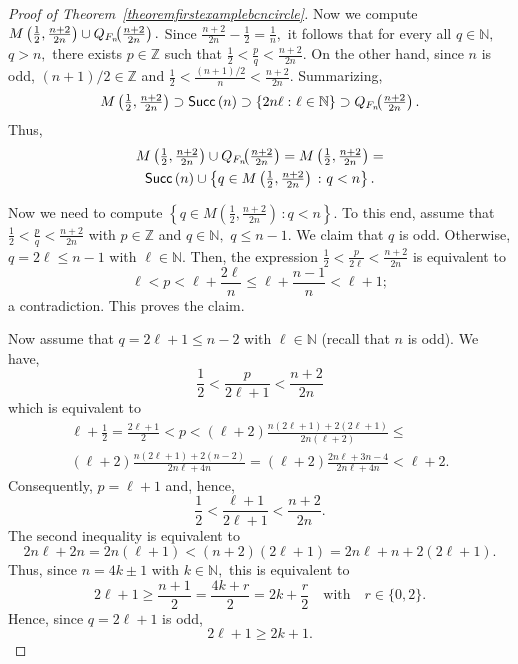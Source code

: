 \documentclass[a4paper, 11pt]{amsart}
\numberwithin{equation}{section}
\theoremstyle{customnumberedtheorem}
\theoremstyle{definitionwithbfnote}
\newcommand{\N}{\ensuremath{\mathbb{N}}}
\newcommand{\Z}{\ensuremath{\mathbb{Z}}}
\DeclareMathOperator{\Succ}{\textsf{\upshape Succ}}
\newcommand{\succs}[1]{\ensuremath{\Succ\left(#1\right)}}
\newcommand{\set}[2]{\ensuremath{\left\{#1 \,\colon #2\right\}}}
\newcommand{\andq}[1][and]{\ensuremath{\quad\text{#1}\quad}}
\begin{document}
\begin{proof}[Proof of Theorem~\ref{theoremfirstexamplebcncircle}]
Now we compute
$
  M\left(\tfrac{1}{2}, \tfrac{n+2}{2n}\right) \cup
  Q_{F_n}\mspace{-8.0mu}\left(\tfrac{n+2}{2n}\right).
$
Since $\tfrac{n+2}{2n} - \tfrac{1}{2} = \tfrac{1}{n},$
it follows that for every all $q \in \N,$ $q > n,$
there exists $p \in \Z$ such that
$\tfrac{1}{2} < \tfrac{p}{q} < \tfrac{n+2}{2n}.$
On the other hand, since $n$ is odd,
$(n+1)/2 \in \Z$ and
$\tfrac{1}{2} < \tfrac{(n+1)/2}{n} < \tfrac{n+2}{2n}.$
Summarizing,
\[
   M\left(\tfrac{1}{2}, \tfrac{n+2}{2n}\right) \supset
   \succs{n} \supset
   \set{2n\ell}{\ell \in \N} \supset
   Q_{F_n}\mspace{-8.0mu}\left(\tfrac{n+2}{2n}\right).
\]
Thus,
\begin{multline*}
   M\left(\tfrac{1}{2}, \tfrac{n+2}{2n}\right) \cup Q_{F_n}\mspace{-8.0mu}\left(\tfrac{n+2}{2n}\right) =
   M\left(\tfrac{1}{2}, \tfrac{n+2}{2n}\right) =\\
   \succs{n} \cup \set{q \in M\left(\tfrac{1}{2}, \tfrac{n+2}{2n}\right)}{q < n}.
\end{multline*}

Now we need to compute
$\set{q \in M\left(\tfrac{1}{2}, \tfrac{n+2}{2n}\right)}{q < n}.$
To this end, assume that
$\tfrac{1}{2} < \tfrac{p}{q} < \tfrac{n+2}{2n}$ with
$p \in \Z$ and $q \in \N,$ $q \le n-1.$
We claim that $q$ is odd.
Otherwise, $q = 2\ell \le n-1$ with $\ell \in \N.$
Then, the expression
$\tfrac{1}{2} < \tfrac{p}{2\ell} < \tfrac{n+2}{2n}$
is equivalent to
\[
  \ell < p < \ell + \frac{2\ell}{n} \le
  \ell + \frac{n-1}{n} <
  \ell + 1;
\]
a contradiction.
This proves the claim.

Now assume that $q = 2\ell + 1 \le n-2$ with $\ell \in \N$
(recall that $n$ is odd).
We have,
\[
  \frac{1}{2} < \frac{p}{2\ell + 1} < \frac{n+2}{2n}
\]
which is equivalent to
\begin{multline*}
  \ell + \frac{1}{2}  = \frac{2\ell + 1}{2} < p <
  (\ell + 2) \frac{n(2\ell + 1) + 2(2\ell + 1)}{2n(\ell + 2)} \le \\
  (\ell + 2) \frac{n(2\ell + 1) + 2(n-2)}{2n\ell + 4n} =
  (\ell + 2) \frac{2n\ell + 3n - 4}{2n\ell + 4n} < \ell + 2.
\end{multline*}
Consequently, $p = \ell + 1$ and, hence,
\[
  \frac{1}{2} < \frac{\ell + 1}{2\ell + 1} < \frac{n+2}{2n}.
\]
The second inequality is equivalent to
\[
 2n\ell + 2n = 2n(\ell + 1) < (n+2)(2\ell + 1) = 2n\ell + n + 2(2\ell + 1).
\]
Thus, since $n = 4k \pm 1$ with $k \in \N,$ this is equivalent to
\[
 2\ell + 1 \ge \frac{n+1}{2} = \frac{4k + r}{2} = 2k + \frac{r}{2} \andq[with] r \in \{0,2\}.
\]
Hence, since $q = 2\ell + 1$ is odd,
\[
 2\ell + 1 \ge 2k + 1.
\]


\end{proof}
\end{document}
